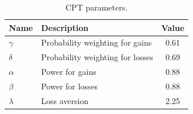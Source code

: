 \documentclass[graybox]{svmult}
\begin{document}
\begin{table}[H]
\caption{\ac{CPT} parameters. \label{tab:cpt_params}}
\begin{tabular}{llc}
\hline
Name & Description & Value \\ \hline
\(\gamma\) & Probability weighting for gains  & 0.61 \\ \hline
\(\delta\) & Probability weighting for losses &  0.69\\ \hline
\(\alpha\) & Power for gains  & 0.88 \\ \hline
\(\beta\) & Power for losses & 0.88 \\ \hline
\(\lambda\) & Loss aversion &  2.25 \\ \hline
\end{tabular}
\end{table}
\end{document}
